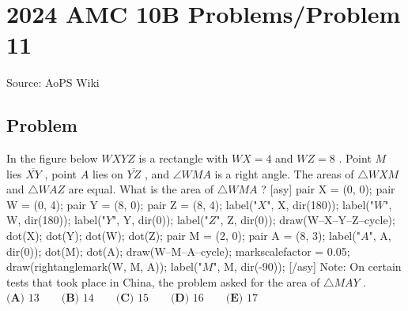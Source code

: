 \documentclass[12pt]{article}
\begin{document}
\section*{{2024 AMC 10B Problems/Problem 11}}
Source: AoPS Wiki

\subsection*{Problem}
In the figure below $WXYZ$ is a rectangle with $WX=4$ and $WZ=8$ . Point $M$ lies $\overline{XY}$ , point $A$ lies on $\overline{YZ}$ , and $\angle WMA$ is a right angle. The areas of $\triangle WXM$ and $\triangle WAZ$ are equal. What is the area of $\triangle WMA$ ? [asy] pair X = (0, 0); pair W = (0, 4); pair Y = (8, 0); pair Z = (8, 4); label("$X$", X, dir(180)); label("$W$", W, dir(180)); label("$Y$", Y, dir(0)); label("$Z$", Z, dir(0)); draw(W--X--Y--Z--cycle); dot(X); dot(Y); dot(W); dot(Z); pair M = (2, 0); pair A = (8, 3); label("$A$", A, dir(0)); dot(M); dot(A); draw(W--M--A--cycle); markscalefactor = 0.05; draw(rightanglemark(W, M, A)); label("$M$", M, dir(-90)); [/asy] Note: On certain tests that took place in China, the problem asked for the area of $\triangle MAY$ . $\textbf{(A) }13 \qquad \textbf{(B) }14 \qquad \textbf{(C) }15 \qquad \textbf{(D) }16 \qquad \textbf{(E) }17 \qquad$
\end{document}

